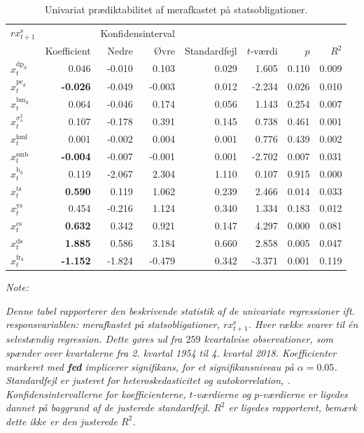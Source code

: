 \documentclass[
  a4paper,
  oneside]{memoir}
\begin{document}
\begin{table}[!h]

\caption{\label{tab:UNI-s}Univariat prædiktabilitet af merafkastet på statsobligationer.}
\centering
\begin{threeparttable}
\begin{tabular}[t]{lrrrrrrr}
\toprule
\multicolumn{1}{c}{$rx_{t+1}^{\text{s}}$} & \multicolumn{1}{c}{ } & \multicolumn{2}{c}{Konfidensinterval} & \multicolumn{4}{c}{ } \\
\cmidrule(l{3pt}r{3pt}){1-1} \cmidrule(l{3pt}r{3pt}){3-4}
  & Koefficient & Nedre & Øvre & Standardfejl & $t$-værdi & $p$ & $R^2$\\
\midrule
\rowcolor{gray!6}  $x_t^{\text{dp}_{\text{d}}}$ & 0.046 & -0.010 & 0.103 & 0.029 & 1.605 & 0.110 & 0.009\\
$x_t^{\text{pe}_{\text{d}}}$ & \textbf{-0.026} & -0.049 & -0.003 & 0.012 & -2.234 & 0.026 & 0.010\\
\rowcolor{gray!6}  $x_t^{\text{bm}_{\text{d}}}$ & 0.064 & -0.046 & 0.174 & 0.056 & 1.143 & 0.254 & 0.007\\
$x_t^{\sigma_{\text{a}}^2}$ & 0.107 & -0.178 & 0.391 & 0.145 & 0.738 & 0.461 & 0.001\\
\rowcolor{gray!6}  $x_t^{\text{hml}}$ & 0.001 & -0.002 & 0.004 & 0.001 & 0.776 & 0.439 & 0.002\\
$x_t^{\text{smb}}$ & \textbf{-0.004} & -0.007 & -0.001 & 0.001 & -2.702 & 0.007 & 0.031\\
\rowcolor{gray!6}  $x_t^{\text{b}_{\text{d}}}$ & 0.119 & -2.067 & 2.304 & 1.110 & 0.107 & 0.915 & 0.000\\
$x_t^{\text{ts}}$ & \textbf{ 0.590} & 0.119 & 1.062 & 0.239 & 2.466 & 0.014 & 0.033\\
\rowcolor{gray!6}  $x_t^{\text{ys}}$ & 0.454 & -0.216 & 1.124 & 0.340 & 1.334 & 0.183 & 0.012\\
$x_t^{\text{cs}}$ & \textbf{ 0.632} & 0.342 & 0.921 & 0.147 & 4.297 & 0.000 & 0.081\\
\rowcolor{gray!6}  $x_t^{\text{ds}}$ & \textbf{ 1.885} & 0.586 & 3.184 & 0.660 & 2.858 & 0.005 & 0.047\\
$x_t^{\text{fr}_{\text{d}}}$ & \textbf{-1.152} & -1.824 & -0.479 & 0.342 & -3.371 & 0.001 & 0.119\\
\bottomrule
\end{tabular}
\begin{tablenotes}
\item \textit{Note: } 
\item \textit{Denne tabel rapporterer den beskrivende statistik af de univariate regressioner ift. responsvariablen: merafkastet på statsobligationer, $rx_{t+1}^{\text{s}}$. Hver række svarer til én selvstændig regression. Dette gøres ud fra $259$ kvartalvise observationer, som spænder over kvartalerne fra 2. kvartal 1954 til 4. kvartal 2018. Koefficienter markeret med \textbf{fed} implicerer signifikans, for et signifikansniveau på $\alpha=0.05$. Standardfejl er justeret for heteroskedasticitet og autokorrelation, \citep{Newey1987}. Konfidensintervallerne for koefficienterne, $t$-værdierne og $p$-værdierne er ligedes dannet på baggrund af de justerede standardfejl. $R^2$ er ligedes rapporteret, bemærk dette ikke er den justerede $R^2$.}

\end{tablenotes}
\end{threeparttable}
\end{table}
\end{document}
